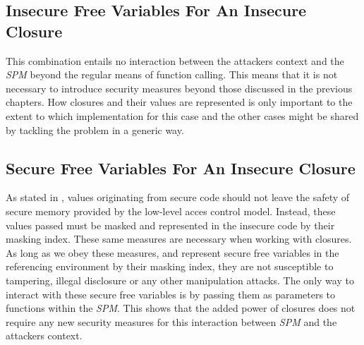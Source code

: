 

\subsection{Insecure Free Variables For An Insecure Closure}

This combination entails no interaction between the attackers context and the \emph{SPM} beyond the regular means of function calling.
This means that it is not necessary to introduce security measures beyond those discussed in the previous chapters.
How closures and their values are represented is only important to the extent to which implementation for this case and the other cases might be shared by tackling the problem in a generic way.

\subsection{Secure Free Variables For An Insecure Closure}

As stated in , values originating from secure code should not leave the safety of secure memory provided by the low-level acces control model.
Instead, these values passed must be masked and represented in the insecure code by their masking index.
These same measures are necessary when working with closures.
As long as we obey these measures, and represent secure free variables in the referencing environment by their masking index, they are not susceptible to tampering, illegal disclosure or any other manipulation attacks.
The only way to interact with these secure free variables is by passing them as parameters to functions within the \emph{SPM}.
This shows that the added power of closures does not require any new security measures for this interaction between \emph{SPM} and the attackers context.

